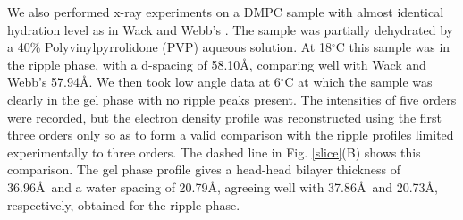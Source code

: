 We also performed x-ray experiments on a DMPC sample with almost identical
hydration level as in Wack and Webb's \cite{Wac89a}. 
The sample was partially dehydrated by a 40\% Polyvinylpyrrolidone
(PVP) aqueous solution.  At 18$^{\circ}$C
this sample was in the ripple phase, with a d-spacing of 58.10\AA, comparing 
well with Wack and Webb's 57.94\AA.  We then took
low angle data at 6$^{\circ}$C at which the sample was clearly in the
gel phase with no ripple peaks present. The intensities of five orders were
recorded, but the electron density profile was reconstructed using
the first three orders only so as to form a valid comparison 
with the ripple profiles limited experimentally to three orders.  The dashed line in 
Fig. \ref{slice}(B) shows this comparison.
The gel phase profile gives a head-head bilayer thickness of 36.96\AA\ and
a water spacing of 20.79\AA, agreeing well with 37.86\AA\ and 20.73\AA,
respectively, obtained for the ripple phase.
\pagebreak
